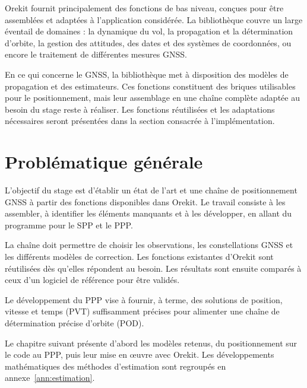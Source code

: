 Orekit fournit principalement des fonctions de bas niveau, conçues pour être assemblées
et adaptées à l'application considérée. La bibliothèque couvre un
large éventail de domaines : la dynamique du vol, la propagation et la détermination
d'orbite, la gestion des attitudes, des dates et des systèmes de coordonnées, ou encore le
traitement de différentes mesures GNSS.

En ce qui concerne le GNSS, la bibliothèque met à disposition des modèles
de propagation et des estimateurs. Ces fonctions constituent des briques
utilisables pour le positionnement, mais leur assemblage en une chaîne
complète adaptée au besoin du stage reste à réaliser.
Les fonctions réutilisées et les adaptations nécessaires seront présentées
dans la section consacrée à l'implémentation.


\section{Problématique générale}

L'objectif du stage est d'établir un état de l'art et une chaîne de positionnement GNSS à
partir des fonctions disponibles dans Orekit. Le travail consiste à les
assembler, à identifier les éléments manquants et à les développer, en allant du programme pour le SPP et le PPP.

La chaîne doit permettre de choisir les observations, les constellations GNSS et
les différents modèles de correction. Les
fonctions existantes d'Orekit sont réutilisées dès qu'elles répondent au
besoin. Les résultats sont ensuite comparés à ceux d'un logiciel de référence pour être validés.

Le développement du PPP vise à fournir, à terme, des solutions de position,
vitesse et temps (PVT) suffisamment précises pour alimenter une chaîne de
détermination précise d'orbite (POD).

Le chapitre suivant présente d'abord les modèles retenus, du positionnement
sur le code au PPP, puis leur mise en œuvre avec Orekit. Les développements
mathématiques des méthodes d'estimation sont regroupés en
annexe~\ref{ann:estimation}.
